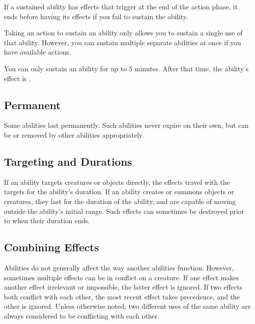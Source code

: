             If a sustained ability has effects that trigger at the end of the action phase, it ends before having its effects if you fail to sustain the ability.

            Taking an action to sustain an ability only allows you to sustain a single use of that ability.
            However, you can sustain multiple separate abilities at once if you have available actions.

            You can only sustain an ability for up to 5 minutes.
            After that time, the ability's effect is .

        \subsection{Permanent}
            Some abilities last permanently.
            Such abilities never expire on their own, but can be  or removed by other abilities appropriately.

        \subsection{Targeting and Durations}
            If an ability targets creatures or objects directly, the effects travel with the targets for the ability's duration.
            If an ability creates or summons objects or creatures, they last for the duration of the ability, and are capable of moving outside the ability's initial range.
            Such effects can sometimes be destroyed prior to when their duration ends.

    \subsection{Combining Effects}
        Abilities do not generally affect the way another abilities function.
        However, sometimes multiple effects can be in conflict on a creature.
        If one effect makes another effect irrelevant or impossible, the latter effect is ignored.
        If two effects both conflict with each other, the most recent effect takes precedence, and the other is ignored.
        Unless otherwise noted, two different uses of the same ability are always considered to be conflicting with each other.

